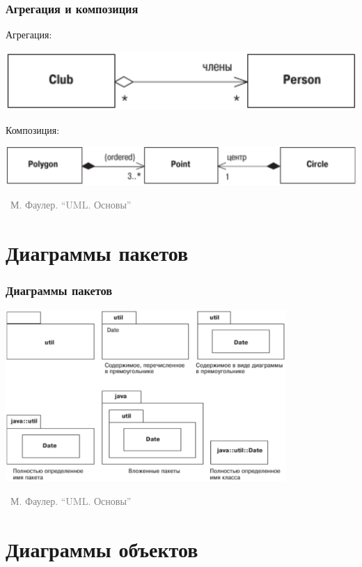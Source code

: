 \documentclass[xetex,mathserif,serif]{beamer}
\newcommand{\attribution}[1] {
	\vspace{-5mm}\begin{flushright}\begin{scriptsize}\textcolor{gray}{\textcopyright\, #1}\end{scriptsize}\end{flushright}
}
\begin{document}
	\begin{frame}
		\frametitle{Агрегация и композиция}
		Агрегация:
		\begin{center}
			\includegraphics[height=0.1\textheight]{aggregation.png}
		\end{center}
		\vspace{5mm}
		Композиция:
		\begin{center}
			\includegraphics[height=0.1\textheight]{composition.png}
		\end{center}
		\attribution{М. Фаулер. ``UML. Основы''}
	\end{frame}

	\section{Диаграммы пакетов}

	\begin{frame}
		\frametitle{Диаграммы пакетов}
		\begin{center}
			\includegraphics[width=0.8\textwidth]{packageDiagrams.png}
			\attribution{М. Фаулер. ``UML. Основы''}
		\end{center}
	\end{frame}

	\section{Диаграммы объектов}
\end{document}
